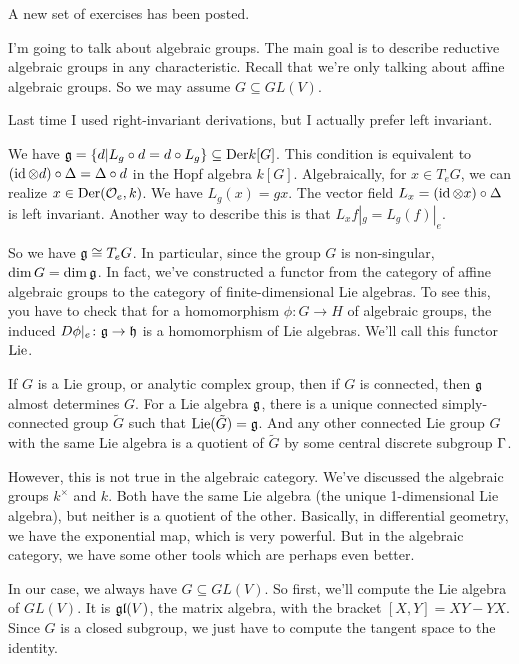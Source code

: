 
A new set of exercises has been posted.

I'm going to talk about algebraic groups. The main goal is to describe reductive algebraic groups in any characteristic. Recall that we're only talking about affine algebraic groups. So we may assume $G\subseteq GL(V)$.

Last time I used right-invariant derivations, but I actually prefer left invariant.

We have $\mathfrak{g}=\{d|L_g\circ d=d\circ L_g\}\subseteq \mathrm{Der} k[G]$. This condition is equivalent to $(\operatorname{id}\otimes d)\circ \Delta=\Delta\circ d$ in the Hopf algebra $k[G]$. Algebraically, for $x\in T_e G$, we can realize $x\in \mathrm{Der}(\mathcal{O}_e,k)$. We have $L_g(x)=gx$. The vector field $L_x=(\operatorname{id}\otimes x)\circ \Delta$ is left invariant. Another way to describe this is that $L_x f|_g=L_g(f)|_e$.

So we have $\mathfrak{g}\cong T_e G$. In particular, since the group $G$ is non-singular, $\dim G=\dim \mathfrak{g}$. In fact, we've constructed a functor from the category of affine algebraic groups to the category of finite-dimensional Lie algebras. To see this, you have to check that for a homomorphism $\phi\colon G\to H$ of algebraic groups, the induced $D\phi|_e\colon \mathfrak{g}\to \mathfrak{h}$ is a homomorphism of Lie algebras. We'll call this functor $\operatorname{Lie}$.

\begin{remark}
 If $G$ is a Lie group, or analytic complex group, then if $G$ is connected, then $\mathfrak{g}$ almost determines $G$. For a Lie algebra $\mathfrak{g}$, there is a unique connected simply-connected group $\tilde G$ such that $\operatorname{Lie}(\tilde G)=\mathfrak{g}$. And any other connected Lie group $G$ with the same Lie algebra is a quotient of $\tilde G$ by some central discrete subgroup $\Gamma$.
 
 However, this is not true in the algebraic category. We've discussed the algebraic groups $k^\times$ and $k$. Both have the same Lie algebra (the unique 1-dimensional Lie algebra), but neither is a quotient of the other. Basically, in differential geometry, we have the exponential map, which is very powerful. But in the algebraic category, we have some other tools which are perhaps even better.
\end{remark}

In our case, we always have $G\subseteq GL(V)$. So first, we'll compute the Lie algebra of $GL(V)$. It is $\mathfrak{gl}(V)$, the matrix algebra, with the bracket $[X,Y]=XY-YX$. Since $G$ is a closed subgroup, we just have to compute the tangent space to the identity.


